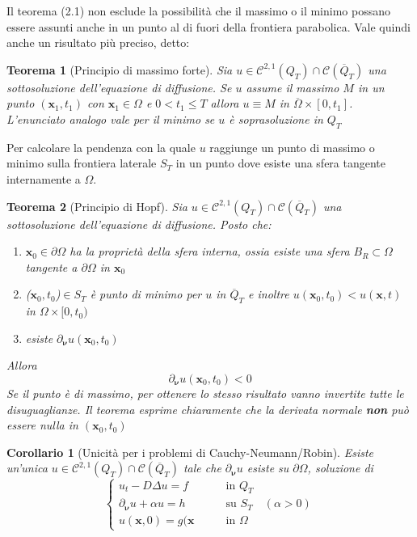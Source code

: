 \documentclass[a4paper,12pt, draft]{article}
\theoremstyle{break}
\newtheorem{theorem}{Teorema}[section]
\newtheorem{corollary}{Corollario}[section]
\numberwithin{equation}{section}
\begin{document}
Il teorema (2.1) non esclude la possibilità che il massimo o il minimo possano essere assunti anche in un punto al di fuori della frontiera parabolica. Vale quindi anche un risultato più preciso, detto:
\begin{theorem}[Principio di massimo forte]
Sia $u \in \mathcal{C}^{2,1}(Q_T)\cap \mathcal{C}(\overline{Q}_T)$ una sottosoluzione dell'equazione di diffusione. Se $u$ assume il massimo $M$ in un punto $(\bm{x}_1, t_1)$ con $\bm{x}_1 \in \Omega$ e $0 < t_1 \leq T$ allora $u \equiv M$ in $\overline{\Omega} \times [0, t_1]$.
L'enunciato analogo vale per il minimo se $u$ è soprasoluzione in $Q_T$
\end{theorem}
Per calcolare la pendenza con la quale $u$ raggiunge un punto di massimo o minimo sulla frontiera laterale $S_T$ in un punto dove esiste una sfera tangente internamente a $\Omega$.
\begin{theorem}[Principio di Hopf]
Sia $u \in \mathcal{C}^{2,1}(Q_T)\cap \mathcal{C}(\overline{Q}_T)$ una sottosoluzione dell'equazione di diffusione. Posto che:
\begin{enumerate}
\item $\bm{x}_0 \in \partial \Omega$ ha la proprietà della sfera interna, ossia esiste una sfera $B_R \subset \Omega$ tangente a $\partial \Omega$ in $\bm{x}_0$
\item ($\bm{x}_0, t_0$)$\in S_T$ è punto di minimo per $u$ in $\overline{Q}_T$ e inoltre $u(\bm{x}_0, t_0) < u(\bm{x}, t)$ in $\Omega \times [0, t_0)$
\item esiste $\partial_{\bm{\nu}}u(\bm{x}_0, t_0)$
\end{enumerate}
Allora 
$$
\partial_{\bm{\nu}} u(\bm{x}_0, t_0) < 0
$$
Se il punto è di massimo, per ottenere lo stesso risultato vanno invertite tutte le disuguaglianze. Il teorema esprime chiaramente che la derivata normale \textbf{non} può essere nulla in $(\bm{x}_0, t_0)$
\end{theorem}
\begin{corollary}[Unicità per i problemi di Cauchy-Neumann/Robin]
Esiste un'unica $u \in \mathcal{C}^{2,1}(Q_T)\cap \mathcal{C}(\overline{Q}_T)$ tale che $\partial_{\bm{\nu}}u$ esiste su $\partial \Omega$, soluzione di 
\begin{equation}
\begin{cases}
u_t - D\Delta u = f & \qquad \mbox{in } Q_T \\
\partial_{\bm{\nu}} u + \alpha u = h & \qquad \mbox{su } S_T \quad (\alpha > 0) \\
u(\bm{x}, 0) = g(\bm{x} & \qquad \mbox{in } \Omega
\end{cases}
\end{equation}
\end{corollary}
\end{document}
